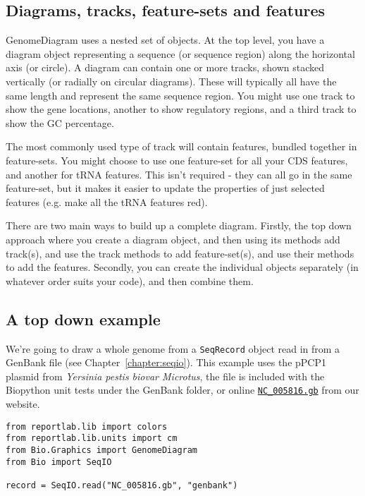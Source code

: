 \subsection{Diagrams, tracks, feature-sets and features}

GenomeDiagram uses a nested set of objects.  At the top level, you have a diagram
object representing a sequence (or sequence region) along the horizontal axis (or
circle).  A diagram can contain one or more tracks, shown stacked vertically (or
radially on circular diagrams).  These will typically all have the same length
and represent the same sequence region.  You might use one track to show the gene
locations, another to show regulatory regions, and a third track to show the GC
percentage. %

The most commonly used type of track will contain features, bundled together in
feature-sets.  You might choose to use one feature-set for all your CDS features,
and another for tRNA features.  This isn't required - they can all go in the same
feature-set, but it makes it easier to update the properties of just selected
features (e.g. make all the tRNA features red).

There are two main ways to build up a complete diagram.  Firstly, the top down
approach where you create a diagram object, and then using its methods add
track(s), and use the track methods to add feature-set(s), and use their
methods to add the features.  Secondly, you can create the individual objects
separately (in whatever order suits your code), and then combine them.

\subsection{A top down example}
\label{sec:gd_top_down}

We're going to draw a whole genome from a \verb|SeqRecord| object read in from
a GenBank file (see Chapter~\ref{chapter:seqio}).  This example uses the
pPCP1 plasmid from \textit{Yersinia pestis biovar Microtus}, the file is
included with the Biopython unit tests under the GenBank folder, or online
\href{https://raw.githubusercontent.com/biopython/biopython/master/Tests/GenBank/NC_005816.gb}
{\texttt{NC\_005816.gb}} from our website.

\begin{verbatim}
from reportlab.lib import colors
from reportlab.lib.units import cm
from Bio.Graphics import GenomeDiagram
from Bio import SeqIO

record = SeqIO.read("NC_005816.gb", "genbank")
\end{verbatim}

